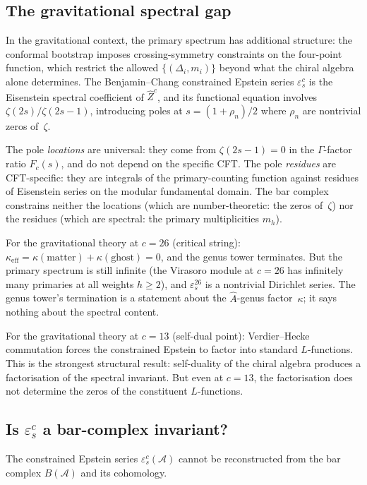 \documentclass[11pt]{article}
\newcommand{\cA}{\mathcal{A}}
\begin{document}
\subsection{The gravitational spectral gap}

In the gravitational context, the primary spectrum has additional
structure: the conformal bootstrap imposes crossing-symmetry
constraints on the four-point function, which restrict the
allowed $\{(\Delta_i, m_i)\}$ beyond what the chiral algebra
alone determines.  The Benjamin--Chang constrained Epstein
series $\varepsilon^c_s$ is the Eisenstein spectral coefficient
of $\hat Z^c$, and its functional equation involves
$\zeta(2s)/\zeta(2s-1)$, introducing poles at
$s = (1+\rho_n)/2$ where $\rho_n$ are nontrivial zeros
of~$\zeta$.

The pole \emph{locations} are universal: they come from
$\zeta(2s-1) = 0$ in the $\Gamma$-factor ratio $F_c(s)$, and
do not depend on the specific CFT.  The pole \emph{residues}
are CFT-specific: they are integrals of the primary-counting
function against residues of Eisenstein series on the modular
fundamental domain.  The bar complex constrains neither the
locations (which are number-theoretic: the zeros of~$\zeta$)
nor the residues (which are spectral: the primary multiplicities
$m_h$).

For the gravitational theory at $c = 26$ (critical string):
$\kappa_{\mathrm{eff}} = \kappa(\mathrm{matter})
+ \kappa(\mathrm{ghost}) = 0$, and the genus tower terminates.
But the primary spectrum is still infinite (the Virasoro module
at $c = 26$ has infinitely many primaries at all weights
$h \geq 2$), and $\varepsilon^{26}_s$ is a nontrivial Dirichlet
series.  The genus tower's termination is a statement about the
$\hat A$-genus factor~$\kappa$; it says nothing about the
spectral content.

For the gravitational theory at $c = 13$ (self-dual point):
Verdier--Hecke commutation forces the constrained Epstein to
factor into standard $L$-functions.  This is the strongest
structural result: self-duality of the chiral algebra produces
a factorisation of the spectral invariant.  But even at
$c = 13$, the factorisation does not determine the zeros of the
constituent $L$-functions.

\subsection{Is $\varepsilon^c_s$ a bar-complex invariant?}

\begin{proposition}
\label{prop:constrained-epstein-not-bar}
The constrained Epstein series $\varepsilon^c_s(\cA)$ cannot be
reconstructed from the bar complex $B(\cA)$ and its cohomology.
\end{proposition}
\end{document}

